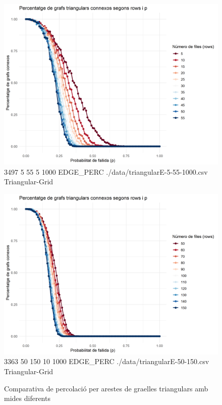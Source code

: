 \documentclass[a4paper]{article}
\begin{document}
	\begin{figure}[H]
		\centering
		\begin{minipage}{0.45\textwidth}
			\centering
			\includegraphics[width=\textwidth]{images/triangularE-5-55-1000}
			\footnotesize{3497 5 55 5 1000 EDGE\_PERC ./data/triangularE-5-55-1000.csv Triangular-Grid}
		\end{minipage}
		\hfill
		\begin{minipage}{0.45\textwidth}
			\centering
			\includegraphics[width=\textwidth]{images/triangularE-50-150}
			\footnotesize{3363 50 150 10 1000 EDGE\_PERC ./data/triangularE-50-150.csv Triangular-Grid}
		\end{minipage}
		\caption{Comparativa de percolació per arestes de graelles triangulars amb mides diferents}
		\label{fig:percolation_edges_triangular}
	\end{figure}
	
\end{document}

